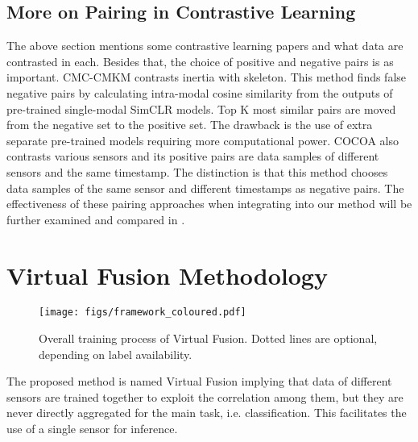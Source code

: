 \documentclass[conference]{IEEEtran}
\begin{document}
\subsection{More on Pairing in Contrastive Learning}
The above section mentions some contrastive learning papers and what data are contrasted in each. Besides that, the choice of positive and negative pairs is as important. CMC-CMKM \cite{Brinzea2022} contrasts inertia with skeleton. This method finds false negative pairs by calculating intra-modal cosine similarity from the outputs of pre-trained single-modal SimCLR models. Top K most similar pairs are moved from the negative set to the positive set. The drawback is the use of extra separate pre-trained models requiring more computational power. COCOA also contrasts various sensors and its positive pairs are data samples of different sensors and the same timestamp. The distinction is that this method chooses data samples of the same sensor and different timestamps as negative pairs. The effectiveness of these pairing approaches when integrating into our method will be further examined and compared in .



\section{Virtual Fusion Methodology}
\begin{figure*}[!t]
\captionsetup{justification=centering}
\centerline{\texttt{[image: figs/framework\_coloured.pdf]}}
\caption{Overall training process of Virtual Fusion. Dotted lines are optional, depending on label availability.}
\label{fig: framework}
\end{figure*}

The proposed method is named Virtual Fusion implying that data of different sensors are trained together to exploit the correlation among them, but they are never directly aggregated for the main task, i.e. classification. This facilitates the use of a single sensor for inference.
\end{document}
